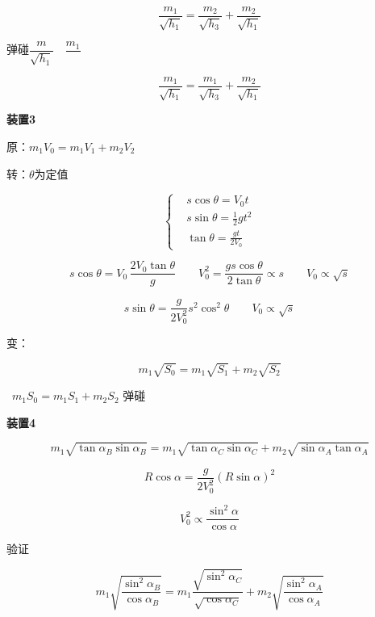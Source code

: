 \[\frac{m_1}{\sqrt{h_1}}=\frac{m_2}{\sqrt{h_3}}+\frac{m_2}{\sqrt{h_1}}\] %

弹碰\quad $\dfrac{m}{\sqrt{h_1}}$\ \unclear{=}\ $\dfrac{m_1}{\ \ }$ %

\[\frac{m_1}{\sqrt{h_1}}=\frac{m_1}{\sqrt{h_3}}+\frac{m_2}{\sqrt{h_1}}\] %

\textbf{装置3}


原：$m_1V_0=m_1V_1+m_2V_2$

转：$\theta$为定值

\[
\left\{
\begin{aligned}
& s\cos\theta=V_0t\\
& \boxed{s\sin\theta=\tfrac{1}{2}gt^2}\\
& \tan\theta=\frac{gt}{2V_0}
\end{aligned}
\right.
\] %

\[
s\cos\theta=V_0\,\frac{2V_0\tan\theta}{g}\qquad V_0^2=\frac{gs\cos\theta}{2\tan\theta}\propto s\qquad V_0\propto\sqrt{s}
\]

\[
s\sin\theta=\frac{g}{2V_0^2}s^2\cos^2\theta\qquad V_0\propto\sqrt{s}
\]

变：
\begin{keybox}
\[m_1\sqrt{S_0}=m_1\sqrt{S_1}+m_2\sqrt{S_2}\]
\end{keybox}

\ $m_1S_0=m_1S_1+m_2S_2$ 弹碰 %

\textbf{装置4}


\[
m_1\sqrt{\tan\alpha_B\sin\alpha_B}=m_1\sqrt{\tan\alpha_C\sin\alpha_C}+m_2\sqrt{\sin\alpha_A\tan\alpha_A}
\] %

\[R\cos\alpha=\frac{g}{2V_0^2}(R\sin\alpha)^2\]

\[V_0^2\propto\frac{\sin^2\alpha}{\cos\alpha}\]

验证
\begin{keybox}
\[
m_1\sqrt{\frac{\sin^2\alpha_B}{\cos\alpha_B}}=m_1\frac{\sqrt{\sin^2\alpha_C}}{\sqrt{\cos\alpha_C}}+m_2\sqrt{\frac{\sin^2\alpha_A}{\cos\alpha_A}}
\] %
\end{keybox}

